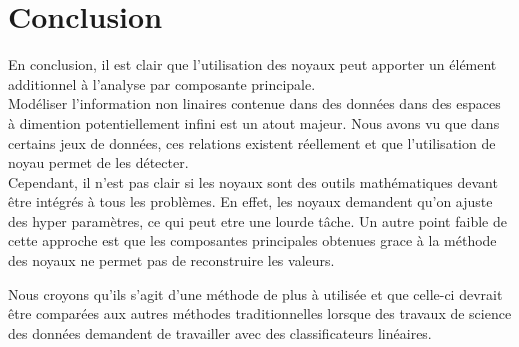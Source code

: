 \section{Conclusion}

En conclusion, il est clair que l'utilisation des noyaux peut apporter un élément additionnel à l'analyse par composante principale.\\

Modéliser l'information non linaires contenue dans des données dans des espaces à dimention potentiellement infini est un atout majeur.
Nous avons vu que dans certains jeux de données, ces relations existent réellement et que l'utilisation de noyau permet de les détecter.\\

Cependant, il n'est pas clair si les noyaux sont des outils mathématiques devant être intégrés à tous les problèmes. 
En effet, les noyaux demandent qu'on ajuste des hyper paramètres, ce qui peut etre une lourde tâche. Un autre point faible de 
cette approche est que les composantes principales obtenues grace à la méthode des noyaux ne permet pas de reconstruire les 
valeurs. 

Nous croyons qu'ils s'agit d'une méthode de plus à utilisée et que celle-ci devrait être comparées aux autres méthodes
traditionnelles lorsque des travaux de science des données demandent de travailler avec des classificateurs linéaires.
